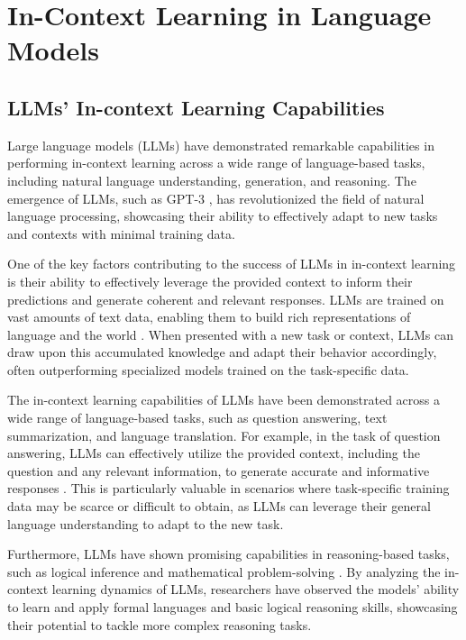 \documentclass[11pt]{article}
\begin{document}
\section{In-Context Learning in Language Models}

\subsection{LLMs' In-context Learning Capabilities}

Large language models (LLMs) have demonstrated remarkable capabilities in performing in-context learning across a wide range of language-based tasks, including natural language understanding, generation, and reasoning. The emergence of LLMs, such as GPT-3 \cite{ref191}, has revolutionized the field of natural language processing, showcasing their ability to effectively adapt to new tasks and contexts with minimal training data.

One of the key factors contributing to the success of LLMs in in-context learning is their ability to effectively leverage the provided context to inform their predictions and generate coherent and relevant responses. LLMs are trained on vast amounts of text data, enabling them to build rich representations of language and the world \cite{ref192,ref193}. When presented with a new task or context, LLMs can draw upon this accumulated knowledge and adapt their behavior accordingly, often outperforming specialized models trained on the task-specific data.

The in-context learning capabilities of LLMs have been demonstrated across a wide range of language-based tasks, such as question answering, text summarization, and language translation. For example, in the task of question answering, LLMs can effectively utilize the provided context, including the question and any relevant information, to generate accurate and informative responses \cite{ref8}. This is particularly valuable in scenarios where task-specific training data may be scarce or difficult to obtain, as LLMs can leverage their general language understanding to adapt to the new task.

Furthermore, LLMs have shown promising capabilities in reasoning-based tasks, such as logical inference and mathematical problem-solving \cite{ref194}. By analyzing the in-context learning dynamics of LLMs, researchers have observed the models' ability to learn and apply formal languages and basic logical reasoning skills, showcasing their potential to tackle more complex reasoning tasks.
\end{document}
